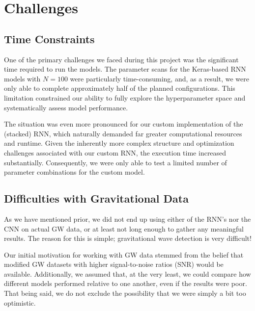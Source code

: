 \documentclass[%
reprint,
amsmath,amssymb,
aps,
]{revtex4-2}
\begin{document}
\section{Challenges}
\label{sec:challenges}

\subsection{Time Constraints}
One of the primary challenges we faced during this project was the significant time required to run the models. The parameter scans for the Keras-based RNN models with $N=100$ were particularly time-consuming, and, as a result, we were only able to complete approximately half of the planned configurations. This limitation constrained our ability to fully explore the hyperparameter space and systematically assess model performance.

The situation was even more pronounced for our custom implementation of the (stacked) RNN, which naturally demanded far greater computational resources and runtime. Given the inherently more complex structure and optimization challenges associated with our custom RNN, the execution time increased substantially. Consequently, we were only able to test a limited number of parameter combinations for the custom model. 



\subsection{Difficulties with Gravitational Data}
As we have mentioned prior, we did not end up using either of the RNN's nor the CNN on actual GW data, or at least not long enough to gather any meaningful results. The reason for this is simple; gravitational wave detection is very difficult! 

Our initial motivation for working with GW data stemmed from the belief that modified GW datasets with higher signal-to-noise ratios (SNR) would be available. Additionally, we assumed that, at the very least, we could compare how different models performed relative to one another, even if the results were poor. That being said, we do not exclude the possibility that we were simply a bit too optimistic. 
\end{document}
